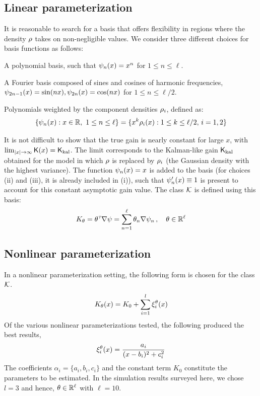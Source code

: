 \subsection*{Linear parameterization}
\label{s:linear_param}
It is reasonable to search for a basis that offers flexibility in regions where the density $\rho$ takes on non-negligible values. We consider three different choices for basis functions as follows:
\begin{romannum}
\item A polynomial basis, such that $\psi_n(x) = x^n$ for $1 \leq n \leq \ell$.
\item A Fourier basis composed of sines and cosines of harmonic frequencies, $\psi_{2n-1}(x) = \sin(n x), \psi_{2n}(x) = \cos(n x)$ for $1 \leq n \leq \ell/2$.
\item Polynomials weighted by the component densities $\rho_i$, defined as: 
\begin{equation}
\{\basis_n(x) : x\in\Re,\ 1\le n\le \ell\}  = \{ x^k \pr_i(x) :  1\le k \le \ell/2, \,  i=1,2\}
\label{e:wt_polynomial_basis}
\end{equation}
\end{romannum}
It is not difficult to show that the true gain is nearly constant for large $x$, with $\lim_{|x|\to\infty} \text{\sf K}(x) = \sf K_{\text{kal}}$. The limit corresponds to the Kalman-like gain $\sf K_{\text{kal}}$ obtained for the model in which $\rho$ is replaced by $\rho_i$  (the Gaussian density with the highest variance). The function $\psi_n(x) = x$ is added to the basis (for choices (ii) and (iii), it is already included in (i)), such that $\psi'_n(x)\equiv 1$ is present to account for this constant asymptotic gain value. The class ${\cal K}$ is defined using this basis:
\begin{equation*}
K_\theta = \theta^{{\hbox{\tiny\it T}}}\nabla \psi = \sum_{n=1}^{\ell}\theta_{n}\nabla \psi_{n}\,, \quad\theta\in\mathbb{R}^{\ell}
\end{equation*}

\subsection*{Nonlinear parameterization}
\label{s:nl_param}
In a nonlinear parameterization setting, the following form is chosen for the class ${\cal K}$.
\begin{equation}
K_\param(x) = K_{0} + \sum_{i=1}^{l} \xi_{i}^{\param}(x)
\label{e:nl_param}
\end{equation}
Of the various nonlinear parameterizations tested, the following produced the best results,
\begin{equation}
\xi_{i}^{\param}(x) = \dfrac{a_{i}}{(x -b_{i})^2 + c_{i}^2}
\label{e:nl_basis}
\end{equation}
The coefficients $\alpha_i  = \{a_i, b_i, c_i \}$ and the constant term $K_0$ constitute the parameters to be estimated.
In the simulation results surveyed here, we chose $l=3$ and hence, $\theta \in \mathbb{R}^{\ell}$ with $\ell=10$.

